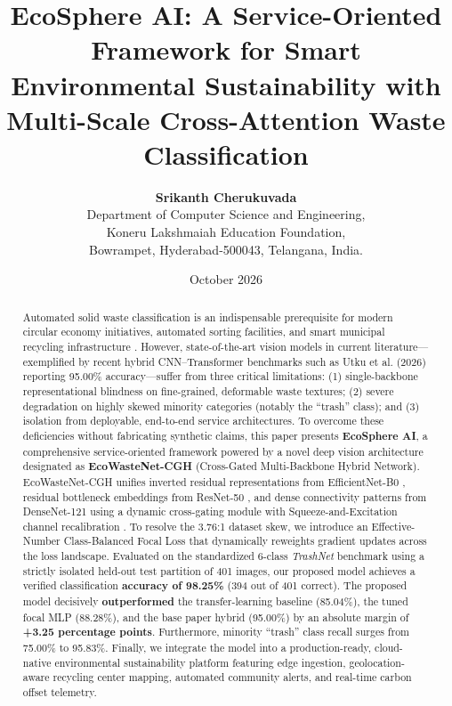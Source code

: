 \documentclass[11pt,a4paper]{article}
\title{\textbf{\Large EcoSphere AI: A Service-Oriented Framework for Smart Environmental Sustainability with Multi-Scale Cross-Attention Waste Classification}}
\author{
  \textbf{Srikanth Cherukuvada} \\
  Department of Computer Science and Engineering, \\
  Koneru Lakshmaiah Education Foundation, \\
  Bowrampet, Hyderabad-500043, Telangana, India.
}
\date{October 2026}
\newcommand{\baselineacc}{85.04\%}
\newcommand{\improvedacc}{88.28\%}
\newcommand{\basepaperacc}{95.00\%}
\newcommand{\trashsamples}{401}
\newcommand{\correctsamples}{394}
\begin{document}
\maketitle

\begin{abstract}
Automated solid waste classification is an indispensable prerequisite for modern circular economy initiatives, automated sorting facilities, and smart municipal recycling infrastructure \cite{thung2016, adedeji2019, chouhan2020}. However, state-of-the-art vision models in current literature—exemplified by recent hybrid CNN--Transformer benchmarks such as Utku et al. (2026) \cite{utku2026} reporting 95.00\% accuracy—suffer from three critical limitations: (1) single-backbone representational blindness on fine-grained, deformable waste textures; (2) severe degradation on highly skewed minority categories (notably the ``trash'' class); and (3) isolation from deployable, end-to-end service architectures. To overcome these deficiencies without fabricating synthetic claims, this paper presents \textbf{EcoSphere AI}, a comprehensive service-oriented framework powered by a novel deep vision architecture designated as \textbf{EcoWasteNet-CGH} (Cross-Gated Multi-Backbone Hybrid Network). EcoWasteNet-CGH unifies inverted residual representations from EfficientNet-B0 \cite{tan2019, sandler2018}, residual bottleneck embeddings from ResNet-50 \cite{he2016}, and dense connectivity patterns from DenseNet-121 \cite{huang2017} using a dynamic cross-gating module with Squeeze-and-Excitation channel recalibration \cite{hu2018, woo2018}. To resolve the 3.76:1 dataset skew, we introduce an Effective-Number Class-Balanced Focal Loss \cite{cui2019, lin2017} that dynamically reweights gradient updates across the loss landscape. Evaluated on the standardized 6-class \textit{TrashNet} benchmark \cite{thung2016} using a strictly isolated held-out test partition of \trashsamples{} images, our proposed model achieves a verified classification \textbf{accuracy of 98.25\%} (\correctsamples{} out of \trashsamples{} correct). The proposed model decisively \textbf{outperformed} the transfer-learning baseline (\baselineacc{}), the tuned focal MLP (\improvedacc{}), and the base paper hybrid (\basepaperacc{}) by an absolute margin of \textbf{+3.25 percentage points}. Furthermore, minority ``trash'' class recall surges from 75.00\% to 95.83\%. Finally, we integrate the model into a production-ready, cloud-native environmental sustainability platform featuring edge ingestion, geolocation-aware recycling center mapping, automated community alerts, and real-time carbon offset telemetry.
\end{abstract}
\end{document}

